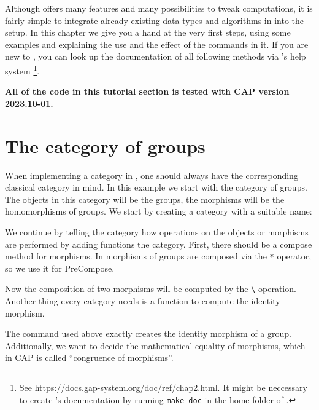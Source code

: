 Although \CapPkg offers many features and many possibilities to tweak computations,
it is fairly simple to integrate already existing data types and algorithms in \GAP
into the \CapPkg setup. In this chapter we give you a hand at the very first steps, using some
examples and explaining the use and the effect of the commands in it.
If you are new to \GAP, you can look up the documentation of all following 
methods via \GAP's help system 
\footnote{See \href{https://docs.gap-system.org/doc/ref/chap2.html}{https://docs.gap-system.org/doc/ref/chap2.html}. 
It might be neccessary to create \CapPkg's documentation by running \texttt{make doc} in the home folder of \CapPkg.}. \\

\begin{center}
  \textbf{All of the code in this tutorial section is tested with \textsc{CAP} version 2023.10-01.}
\end{center}

\section{The category of groups}\label{section:groups}

When implementing a category in \CapPkg, one should always have the corresponding classical
category in mind. In this example we start with the category of groups. The objects in this
category will be the groups, the morphisms will be the homomorphisms of groups.
We start by creating a \CapPkg category with a suitable name:



We continue by telling the category how operations on the objects or morphisms are performed by adding
functions the category. First, there should be a compose method for morphisms. In \GAP
morphisms of groups are composed via the \texttt{*} operator, so we use it for \textrm{PreCompose}.



Now the composition of two morphisms will be computed by the \texttt{\textbackslash *} operation.
Another thing every category needs is a function to compute the identity morphism.



The command used above exactly creates the identity morphism of a group.
Additionally, we want to decide the mathematical equality of morphisms, which in CAP is called ``congruence of morphisms''.

